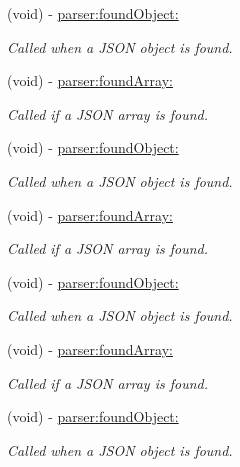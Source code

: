 \begin{DoxyCompactItemize}
(void) -\/ \hyperlink{protocol_s_b_json_stream_parser_adapter_delegate-p_abefd538a1ce6d75eb3e8572a1049f597}{parser\-:found\-Object\-:}
\begin{DoxyCompactList}\small\item\em \-Called when a \-J\-S\-O\-N object is found. \end{DoxyCompactList}\item 
(void) -\/ \hyperlink{protocol_s_b_json_stream_parser_adapter_delegate-p_acac3b4b2e4cfb45a8ca8ca945a47e326}{parser\-:found\-Array\-:}
\begin{DoxyCompactList}\small\item\em \-Called if a \-J\-S\-O\-N array is found. \end{DoxyCompactList}\item 
(void) -\/ \hyperlink{protocol_s_b_json_stream_parser_adapter_delegate-p_abefd538a1ce6d75eb3e8572a1049f597}{parser\-:found\-Object\-:}
\begin{DoxyCompactList}\small\item\em \-Called when a \-J\-S\-O\-N object is found. \end{DoxyCompactList}\item 
(void) -\/ \hyperlink{protocol_s_b_json_stream_parser_adapter_delegate-p_acac3b4b2e4cfb45a8ca8ca945a47e326}{parser\-:found\-Array\-:}
\begin{DoxyCompactList}\small\item\em \-Called if a \-J\-S\-O\-N array is found. \end{DoxyCompactList}\item 
(void) -\/ \hyperlink{protocol_s_b_json_stream_parser_adapter_delegate-p_abefd538a1ce6d75eb3e8572a1049f597}{parser\-:found\-Object\-:}
\begin{DoxyCompactList}\small\item\em \-Called when a \-J\-S\-O\-N object is found. \end{DoxyCompactList}\item 
(void) -\/ \hyperlink{protocol_s_b_json_stream_parser_adapter_delegate-p_acac3b4b2e4cfb45a8ca8ca945a47e326}{parser\-:found\-Array\-:}
\begin{DoxyCompactList}\small\item\em \-Called if a \-J\-S\-O\-N array is found. \end{DoxyCompactList}\item 
(void) -\/ \hyperlink{protocol_s_b_json_stream_parser_adapter_delegate-p_abefd538a1ce6d75eb3e8572a1049f597}{parser\-:found\-Object\-:}
\begin{DoxyCompactList}\small\item\em \-Called when a \-J\-S\-O\-N object is found. \end{DoxyCompactList}\end{DoxyCompactItemize}



